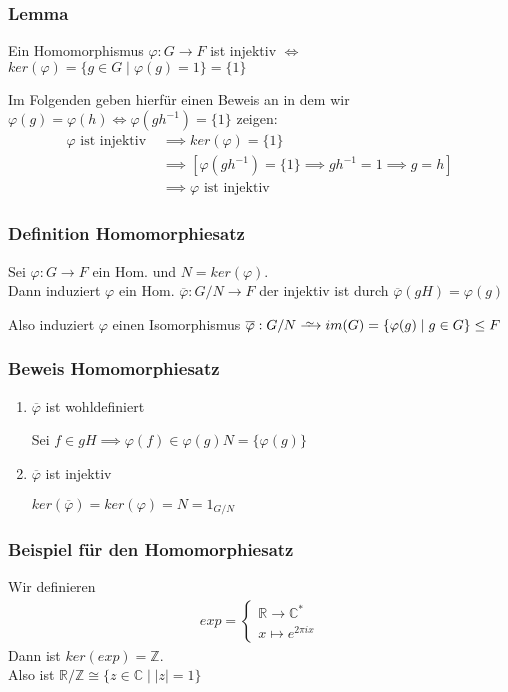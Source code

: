 \documentclass[12pt, german]{article}
\newcommand\iso{\xrightarrow{
		\,\smash{\raisebox{-0.65ex}{\ensuremath{\scriptstyle\sim}}}\,}}
\begin{document}
\subsubsection{Lemma}
	Ein Homomorphismus $\varphi: G \to F$ ist injektiv $\iff$ $ker(\varphi) = \{g \in G \mid \varphi(g)= 1\} = \{1\}$ 
	
	Im Folgenden geben hierfür einen Beweis an in dem wir $\varphi(g) = \varphi(h) \iff \varphi(gh^{-1}) = \{1\} $ zeigen:
	\begin{align*}
		\varphi \text{ ist injektiv } &\implies ker(\varphi) = \{1\} \\
		&\implies [\varphi(gh^{-1}) = \{1\} \implies gh^{-1} = 1 \implies g = h] \\ 
		&\implies \varphi \text{ ist injektiv}
	\end{align*}

\subsubsection{Definition Homomorphiesatz}
	Sei $\varphi: G \to F$ ein Hom.  und $N = ker(\varphi)$. \\
	Dann induziert $\varphi$ ein Hom. $\overline{\varphi} : G/N \to F$ der injektiv ist durch $\overline{\varphi}(gH) = \varphi(g)$ 
	\newline
	
	Also induziert $\varphi$ einen Isomorphismus $\overline{\varphi}: G/N \iso im(G) = \{\varphi(g) \mid g \in G\} \leq F$

\subsubsection{Beweis Homomorphiesatz}
	\begin{enumerate}[label=\arabic*)]
		\item $\overline{\varphi}$ ist wohldefiniert ~\par
				Sei $f\in gH \implies \varphi(f) \in \varphi(g)N = \{\varphi(g)\}$
		
		\item $\overline{\varphi}$ ist injektiv ~\par
			$ker(\overline{\varphi}) = ker(\varphi) = N = 1_{G/N}$
	\end{enumerate}
\newpage
\subsubsection{Beispiel für den Homomorphiesatz}
	Wir definieren 
		\begin{align*}
			exp = \begin{cases}
			\mathbb{R} \to \mathbb{C}^\ast\\
			x \mapsto e^{2\pi i x}
			\end{cases}
		\end{align*}
	Dann ist $ker(exp) = \mathbb Z $.\\ 
	 Also ist $\mathbb R / \mathbb Z \cong \{z \in \mathbb C \mid |z| = 1\}$	
\end{document}
